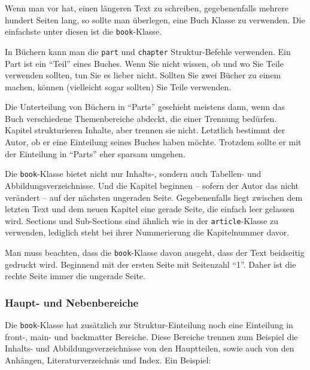 Wenn man vor hat, einen längeren Text zu schreiben, gegebenenfalls mehrere hundert Seiten lang, so sollte man überlegen, eine Buch Klasse zu verwenden. Die einfachste unter diesen ist die \texttt{book}-Klasse.

In Büchern kann man die \texttt{part} und \texttt{chapter} Struktur-Befehle verwenden. Ein Part ist ein "`Teil"' eines Buches. Wenn Sie nicht wissen, ob und wo Sie Teile verwenden sollten, tun Sie es lieber nicht. Sollten Sie zwei Bücher zu einem machen, können (vielleicht sogar sollten) Sie Teile verwenden. 

Die Unterteilung von Büchern in "`Parts"' geschieht meistens dann, wenn das Buch verschiedene Themenbereiche abdeckt, die einer Trennung bedürfen. Kapitel strukturieren Inhalte, aber trennen sie nicht. Letztlich bestimmt der Autor, ob er eine Einteilung seines Buches haben möchte. Trotzdem sollte er mit der Einteilung in "`Parts"' eher sparsam umgehen.

Die \texttt{book}-Klasse bietet nicht nur Inhalts-, sondern auch Tabellen- und Abbildungsverzeichnisse. Und die Kapitel beginnen -- sofern der Autor das nicht verändert -- auf der nächsten ungeraden Seite. Gegebenenfalls liegt zwischen dem letzten Text und dem neuen Kapitel eine gerade Seite, die einfach leer gelassen wird. Sections und Sub-Sections sind ähnlich wie in der \texttt{article}-Klasse zu verwenden, lediglich steht bei ihrer Nummerierung die Kapitelnummer davor. 

Man muss beachten, dass die \texttt{book}-Klasse davon ausgeht, dass der Text beidseitig gedruckt wird. Beginnend mit der ersten Seite mit Seitenzahl "`1"'. Daher ist die rechte Seite immer die ungerade Seite. 

\subsubsection{Haupt- und Nebenbereiche}

Die \texttt{book}-Klasse hat zusätzlich zur Struktur-Einteilung noch eine Einteilung in front-, main- und backmatter Bereiche. Diese Bereiche trennen zum Beispiel die Inhalts- und Abbildungsverzeichnisse von den Hauptteilen, sowie auch von den Anhängen, Literaturverzeichnis und Index. Ein Beispiel:

